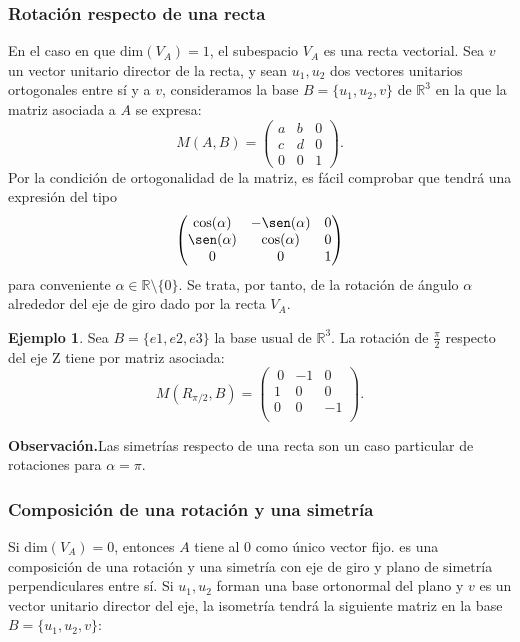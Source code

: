 \documentclass[11pt]{article}
\theoremstyle{definition}
\newtheorem{ejemplo}{Ejemplo}[section]
\begin{document}
\subsubsection{Rotación respecto de una recta}
En el caso en que $\mathrm{dim}(V_A)=1$, el subespacio $V_A$ es una recta vectorial. Sea $v$ un vector unitario director de la recta, y sean $u_1,u_2$ dos vectores unitarios ortogonales entre sí y a $v$, consideramos la base $B=\{u_1,u_2,v\}$ de $\mathbb R^3$ en la que la matriz asociada a $A$ se expresa:
    \[M(A, B)=\begin{pmatrix}a&b&0\\c&d&0\\0&0&1\end{pmatrix}.\]
Por la condición de ortogonalidad de la matriz, es fácil comprobar que tendrá una expresión del tipo
    \[\begin{pmatrix}\cos(\alpha)&-\sen(\alpha)&0\\\sen(\alpha)&\cos(\alpha)&0\\0&0&1\end{pmatrix}\]
    para conveniente $\alpha\in \mathbb R\setminus\{0\}$. Se trata, por tanto, de la rotación de ángulo $\alpha$ alrededor del eje de giro dado por la recta $V_A$.


\begin{ejemplo}
Sea $B=\{e1 , e2 , e3\}$ la base usual de  $\mathbb{R}^3$. La rotación de $\frac\pi 2$ respecto del eje Z tiene por matriz asociada:
\[M(R_{\pi/2},B)=
    \begin{pmatrix}
    \ 0 & -1 & 0 \\ 1 & 0 & 0 \\ 0 & 0 & -1 \\
    \end{pmatrix}.
  \]
\end{ejemplo}

\noindent\textbf{Observación.}\quad Las simetrías respecto de una recta son un caso particular de rotaciones para $\alpha=\pi$.
    \\

\subsubsection{Composición de una rotación y una simetría}

Si $\mathrm{dim}(V_A)=0$, entonces $A$ tiene al $0$ como único vector fijo. es una composición de una rotación y una simetría con eje de giro y plano de simetría perpendiculares entre sí. Si $u_1, u_2$ forman una base ortonormal del plano y $v$ es un vector unitario director del eje, la isometría tendrá la siguiente matriz en la base $B=\{u_1,u_2,v\}$:
\end{document}
